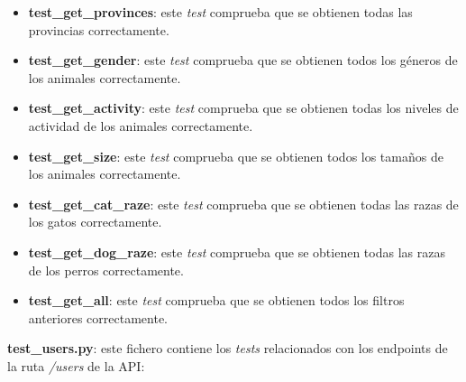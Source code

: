 \begin{itemize}
    \item \textbf{test\_get\_provinces}: este \textit{test} comprueba que se obtienen todas las provincias correctamente.
    \item \textbf{test\_get\_gender}: este \textit{test} comprueba que se obtienen todos los géneros de los animales correctamente.
    \item \textbf{test\_get\_activity}: este \textit{test} comprueba que se obtienen todas los niveles de actividad de los animales correctamente.
    \item \textbf{test\_get\_size}: este \textit{test} comprueba que se obtienen todos los tamaños de los animales correctamente.
    \item \textbf{test\_get\_cat\_raze}: este \textit{test} comprueba que se obtienen todas las razas de los gatos correctamente.
    \item \textbf{test\_get\_dog\_raze}: este \textit{test} comprueba que se obtienen todas las razas de los perros correctamente.
    \item \textbf{test\_get\_all}: este \textit{test} comprueba que se obtienen todos los filtros anteriores correctamente.
\end{itemize}

\textbf{test\_users.py}: este fichero contiene los \textit{tests} relacionados con los endpoints de la ruta \textit{/users} de la API:

